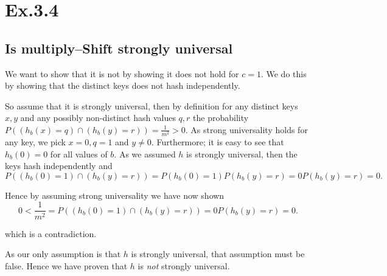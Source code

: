 \section*{Ex.3.4}
\subsection*{Is multiply--Shift strongly universal}

We want to show that it is not by showing it does not hold for $c=1$. We do this by showing that the distinct keys does not hash independently.

So assume that it is strongly universal, then by definition  for any distinct keys $x,y$ and any possibly non-distinct hash values $q,r$ the probability $P((h_b(x) = q) \cap (h_b(y) = r)) = \frac{1}{m^2}>0$. As strong universality holds for any key, we pick $x=0, q=1$ and $y\neq 0$. Furthermore; it is easy to see that $h_b(0)=0$ for all values of $b$. As we assumed $h$ is strongly universal, then the keys hash independently and
$$
P((h_b(0) = 1) \cap (h_b(y) = r)) = P(h_b(0) = 1) P(h_b(y) = r) = 0 P(h_b(y) = r) = 0.
$$

Hence by assuming strong universality we have now shown
$$
0< \frac{1}{m^2} = P((h_b(0) = 1) \cap (h_b(y) = r)) = 0 P(h_b(y) = r) = 0.
$$

which is a contradiction.

As our only assumption is that $h$ is strongly universal, that assumption must be false. Hence we have proven that $h$ is \emph{not} strongly universal.